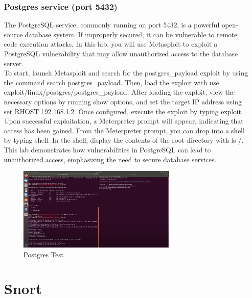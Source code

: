 \documentclass[a4paper,11pt]{article} %
\begin{document}
\subsubsection{Postgres service (port 5432)}
The PostgreSQL service, commonly running on port 5432, is a powerful open-source database system. If improperly secured, it can be vulnerable to remote code execution attacks. In this lab, you will use Metasploit to exploit a PostgreSQL vulnerability that may allow unauthorized access to the database server.\\
To start, launch Metasploit and search for the postgres\_payload exploit by using the command search postgres\_payload. Then, load the exploit with use exploit/linux/postgres/postgres\_payload. After loading the exploit, view the necessary options by running show options, and set the target IP address using set RHOST 192.168.1.2. Once configured, execute the exploit by typing exploit.\\
Upon successful exploitation, a Meterpreter prompt will appear, indicating that access has been gained. From the Meterpreter prompt, you can drop into a shell by typing shell. In the shell, display the contents of the root directory with ls /. This lab demonstrates how vulnerabilities in PostgreSQL can lead to unauthorized access, emphasizing the need to secure database services. 

\begin{figure}[h!]
    \centering
    \includegraphics[width=0.7\textwidth]{images/14.png}
    \caption{Postgres Test}
\end{figure}

\newpage
\section{Snort}
\end{document}
